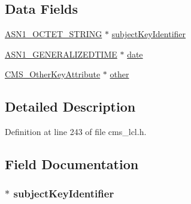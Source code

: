 \subsection*{Data Fields}
\begin{DoxyCompactItemize}
\item 
\hyperlink{crypto_2ossl__typ_8h_afbd05e94e0f0430a2b729473efec88c1}{A\+S\+N1\+\_\+\+O\+C\+T\+E\+T\+\_\+\+S\+T\+R\+I\+NG} $\ast$ \hyperlink{struct_c_m_s___recipient_key_identifier__st_ac3ff899746c2156f685737e09ccbb4fa}{subject\+Key\+Identifier}
\item 
\hyperlink{crypto_2ossl__typ_8h_abd19ea5b527807ce3a516e6a41440f84}{A\+S\+N1\+\_\+\+G\+E\+N\+E\+R\+A\+L\+I\+Z\+E\+D\+T\+I\+ME} $\ast$ \hyperlink{struct_c_m_s___recipient_key_identifier__st_a8dac4347fb9055f16f81837db490d51a}{date}
\item 
\hyperlink{crypto_2cms_2cms_8h_af54d24ab3b9acdc97b67988d660ede75}{C\+M\+S\+\_\+\+Other\+Key\+Attribute} $\ast$ \hyperlink{struct_c_m_s___recipient_key_identifier__st_a75d0a1d8882aba95c23c4e0e11debc48}{other}
\end{DoxyCompactItemize}


\subsection{Detailed Description}


Definition at line 243 of file cms\+\_\+lcl.\+h.



\subsection{Field Documentation}
\subsubsection[{\texorpdfstring{subject\+Key\+Identifier}{subjectKeyIdentifier}}]{$\ast$ subject\+Key\+Identifier}\hypertarget{struct_c_m_s___recipient_key_identifier__st_ac3ff899746c2156f685737e09ccbb4fa}{}\label{struct_c_m_s___recipient_key_identifier__st_ac3ff899746c2156f685737e09ccbb4fa}


